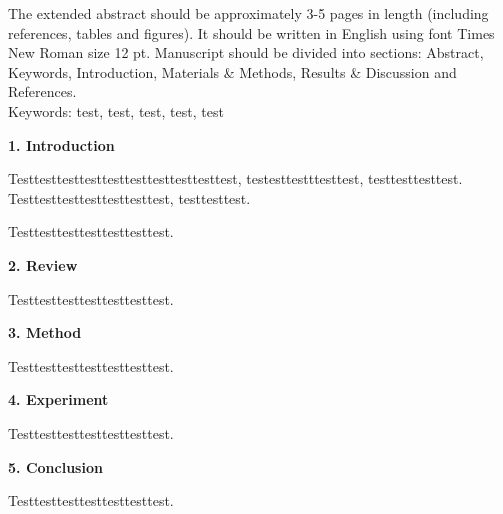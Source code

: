 \documentclass[12pt,a4paper,oneside]{book}
\begin{document}
\begin{NFUExtendedAbstract}




The extended abstract should be approximately 3-5 pages in length (including references, tables and figures). It should be written in English using font Times New Roman size 12 pt. Manuscript should be divided into sections: Abstract, Keywords, Introduction, Materials \& Methods, Results \& Discussion and References. 
\\

\noindent
Keywords: test, test, test, test, test

\clearpage %

{\fontsize{16}{18}\selectfont
\noindent
\textbf{1. Introduction}}\\
\vspace{-2em}

Testtesttesttesttesttesttesttesttesttest, testesttestttesttest, testtesttesttest. Testtesttesttesttesttesttest, testtesttest.

Testtesttesttesttesttesttest.

\vspace{2em}
{\fontsize{16}{18}\selectfont
\noindent
\textbf{2. Review}}\\
\vspace{-2em}

Testtesttesttesttesttesttest.

\vspace{2em}
{\fontsize{16}{18}\selectfont
\noindent
\textbf{3. Method}}\\
\vspace{-2em}

Testtesttesttesttesttesttest.

\vspace{2em}
{\fontsize{16}{18}\selectfont
\noindent
\textbf{4. Experiment}}\\
\vspace{-2em}

Testtesttesttesttesttesttest.

\vspace{2em}
{\fontsize{16}{18}\selectfont
\noindent
\textbf{5. Conclusion}}\\
\vspace{-2em}

Testtesttesttesttesttesttest.



\end{NFUExtendedAbstract}
\end{document}
